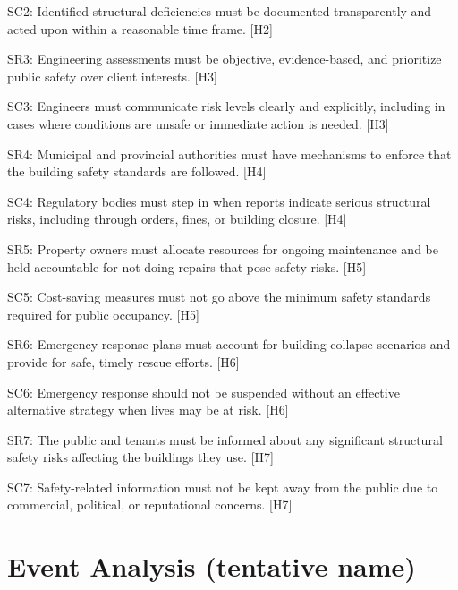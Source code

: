 \documentclass[12pt]{article}
\begin{document}
SC2: Identified structural deficiencies must be documented transparently and acted upon within a reasonable time frame. [H2]

SR3: Engineering assessments must be objective, evidence-based, and prioritize public safety over client interests. [H3]

SC3: Engineers must communicate risk levels clearly and explicitly, including in cases where conditions are unsafe or immediate action is needed. [H3]

SR4: Municipal and provincial authorities must have mechanisms to enforce that the building safety standards are followed. [H4]

SC4: Regulatory bodies must step in when reports indicate serious structural risks, including through orders, fines, or building closure. [H4]

SR5: Property owners must allocate resources for ongoing maintenance and be held accountable for not doing repairs that pose safety risks. [H5]

SC5: Cost-saving measures must not go above the minimum safety standards required for public occupancy. [H5]

SR6: Emergency response plans must account for building collapse scenarios and provide for safe, timely rescue efforts. [H6]

SC6: Emergency response should not be suspended without an effective alternative strategy when lives may be at risk. [H6]

SR7: The public and tenants must be informed about any significant structural safety risks affecting the buildings they use. [H7]

SC7: Safety-related information must not be kept away from the public due to commercial, political, or reputational concerns. [H7]




\section{Event Analysis (tentative name)} %
\end{document}
